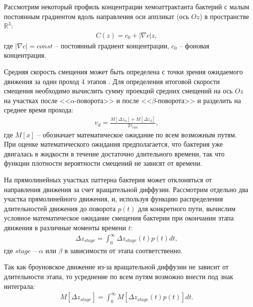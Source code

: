 Рассмотрим некоторый профиль концентрации хемоаттрактанта бактерий с малым постоянным градиентом вдоль направления оси аппликат (ось $Oz$) в пространстве $\mathbb{R}^3$:
\begin{equation}
    \begin{aligned}
        C(z) = c_0 + |\nabla c| z,
    \label{eq:linear-concentration}
    \end{aligned}
\end{equation}
где $|\nabla c|=const$ -- постоянный градиент концентрации, $c_0$ -- фоновая концентрация.

Средняя скорость смещения может быть определена с точки зрения ожидаемого движения за один проход 4 этапов \cite{locsei_persistence_2007}. Для определения итоговой скорости смещения необходимо вычислить сумму проекций средних смещений на ось $Oz$ на участках после <<$\alpha$-поворота>> и после <<$\beta$-поворота>> и разделить на среднее время прохода:
\begin{equation}
    \begin{aligned}
        v_d=\frac{M[\Delta z_{\alpha}] + M[\Delta z_{\beta}]}{{2\tau_{run}}},
    \label{eq:drift-speed-alpha-beta}
    \end{aligned}
\end{equation}
где $M[x]$ -- обозначает математическое ожидание по всем возможным путям. При оценке математического ожидания предполагается, что бактерия уже двигалась в жидкости в течение достаточно длительного времени, так что функции плотности вероятности смещений не зависят от времени. 

На прямолинейных участках паттерна бактерия может отклоняться от направления движения за счет вращательной диффузии. Рассмотрим отдельно два участка прямолинейного движения, и, используя функцию распределения длительностей движения до поворота $p(t)$ для конкретного пути, вычислим условное математическое ожидание смещения бактерии при окончании этапа движения в различные моменты времени $t$:
\begin{equation}
    \begin{aligned}
        \Delta z_{stage}=\int_0^{\infty} \Delta z_{stage}(t)p(t)dt,
    \label{eq:displacement-integral-time}
    \end{aligned}
\end{equation}
где $stage$ -- $\alpha$ или $\beta$ в зависимости от этапа соответственно.

Так как броуновское движение из-за вращательной диффузии не зависит от длительности этапа, то усреднение по всем путям возможно внести под знак интеграла:
\begin{equation}
    \begin{aligned}
        M[\Delta z_{stage}]=\int_0^{\infty} M[\Delta z_{stage}(t)p(t)]dt.
    \label{eq:mean-displacement-integral-time}
    \end{aligned}
\end{equation}

